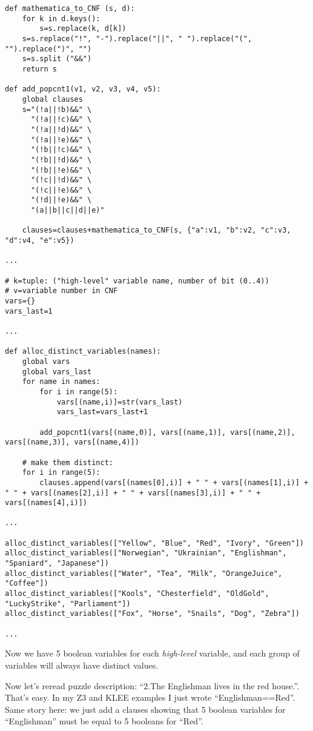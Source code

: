 \begin{lstlisting}
def mathematica_to_CNF (s, d):
    for k in d.keys():
        s=s.replace(k, d[k])
    s=s.replace("!", "-").replace("||", " ").replace("(", "").replace(")", "")
    s=s.split ("&&")
    return s

def add_popcnt1(v1, v2, v3, v4, v5):
    global clauses
    s="(!a||!b)&&" \
      "(!a||!c)&&" \
      "(!a||!d)&&" \
      "(!a||!e)&&" \
      "(!b||!c)&&" \
      "(!b||!d)&&" \
      "(!b||!e)&&" \
      "(!c||!d)&&" \
      "(!c||!e)&&" \
      "(!d||!e)&&" \
      "(a||b||c||d||e)"

    clauses=clauses+mathematica_to_CNF(s, {"a":v1, "b":v2, "c":v3, "d":v4, "e":v5})

...

# k=tuple: ("high-level" variable name, number of bit (0..4))
# v=variable number in CNF
vars={}
vars_last=1

...

def alloc_distinct_variables(names):
    global vars
    global vars_last
    for name in names:
        for i in range(5):
            vars[(name,i)]=str(vars_last)
            vars_last=vars_last+1

        add_popcnt1(vars[(name,0)], vars[(name,1)], vars[(name,2)], vars[(name,3)], vars[(name,4)])

    # make them distinct:
    for i in range(5):
        clauses.append(vars[(names[0],i)] + " " + vars[(names[1],i)] + " " + vars[(names[2],i)] + " " + vars[(names[3],i)] + " " + vars[(names[4],i)])

...

alloc_distinct_variables(["Yellow", "Blue", "Red", "Ivory", "Green"])
alloc_distinct_variables(["Norwegian", "Ukrainian", "Englishman", "Spaniard", "Japanese"])
alloc_distinct_variables(["Water", "Tea", "Milk", "OrangeJuice", "Coffee"])
alloc_distinct_variables(["Kools", "Chesterfield", "OldGold", "LuckyStrike", "Parliament"])
alloc_distinct_variables(["Fox", "Horse", "Snails", "Dog", "Zebra"])

...

\end{lstlisting}

Now we have 5 boolean variables for each \textit{high-level} variable,
and each group of variables will always have distinct values.

Now let's reread puzzle description: ``2.The Englishman lives in the red house.''.
That's easy.
In my Z3 and KLEE examples I just wrote ``Englishman==Red''.
Same story here: we just add a clauses showing that 5 boolean variables for ``Englishman''
must be equal to 5 booleans for ``Red''.

